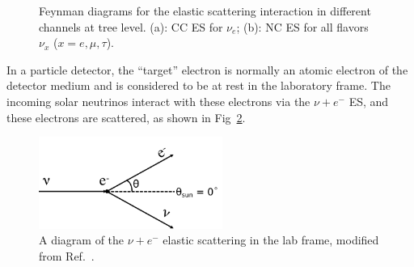 \begin{figure}[htbp]
	\centering
	\caption[Feynman diagrams for the elastic scattering interaction at tree level.]{Feynman diagrams for the elastic scattering interaction in different channels at tree level. (a): CC ES for $\nu_e$; (b): NC ES for all flavors $\nu_x$ ($x=e,\mu,\tau$).\label{fig:feynman-es}}
\end{figure}


In a particle detector, the ``target'' electron is normally an atomic electron of the detector medium and is considered to be at rest in the laboratory frame. The incoming solar neutrinos interact with these electrons via the $\nu+e^-$ ES, and these electrons are scattered, as shown in Fig~\ref{fig:ESdiagram}. 

\begin{figure}[htbp]
	\centering	
	\includegraphics[width=6cm]{ElasticScatteringCartoon.png}
	\caption[A diagram of the $\nu + e^-$ elastic scattering in the lab frame.]{A diagram of the $\nu + e^-$ elastic scattering in the lab frame, modified from Ref.~\cite{giunti2007fundamentals}.	\label{fig:ESdiagram}}
\end{figure}

